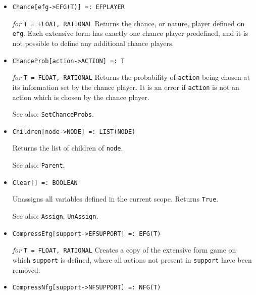 \begin{itemize}
\item{}
\protect \large \begin{verbatim}
Chance[efg->EFG(T)] =: EFPLAYER
\end{verbatim}\normalsize

{\it for} {\tt T = FLOAT, RATIONAL}
\bd
Returns the chance, or nature, player defined on \verb+efg+.
Each extensive form has exactly one
chance player predefined, and it is not possible to define any additional
chance players.
\ed

\item{}
\protect \large \begin{verbatim}
ChanceProb[action->ACTION] =: T
\end{verbatim}\normalsize

{\it for} {\tt T = FLOAT, RATIONAL}
\bd
Returns the probability of \verb+action+ being chosen at its information
set by the chance player.  It is an error if \verb+action+ is not an action
which is chosen by the chance player.
\item [See also:] \verb+SetChanceProbs+.
\ed

\item{}
\protect \large \begin{verbatim} 
Children[node->NODE] =: LIST(NODE)
\end{verbatim}\normalsize

\bd
Returns the list of children of \verb+node+.
\item [See also:] \verb+Parent+.
\ed

\item{}
\protect \large \begin{verbatim}
Clear[] =: BOOLEAN
\end{verbatim}\normalsize

\bd
Unassigns all variables defined in the current scope.  Returns \verb+True+.
\item [See also:] \verb+Assign+, \verb+UnAssign+.
\ed

\item{}
\protect \large \begin{verbatim}
CompressEfg[support->EFSUPPORT] =: EFG(T)
\end{verbatim}\normalsize

{\it for} {\tt T = FLOAT, RATIONAL}
\bd
Creates a copy of the extensive form game on which \verb+support+ is
defined, where all actions not present in \verb+support+ have been
removed.
\ed

\item{}
\protect \large \begin{verbatim}
CompressNfg[support->NFSUPPORT] =: NFG(T)
\end{verbatim}\normalsize


\end{itemize}
